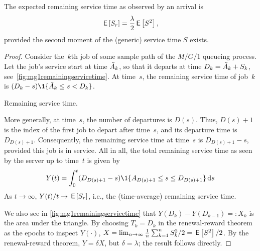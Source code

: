 \documentclass[stochastic-or.tex]{subfiles}
\begin{document}
\begin{theorem}
The expected remaining service time as observed by an arrival is
\begin{equation*}
\,\mathsf{E}\left[S_r\right] = \frac{\lambda}2 \,\mathsf{E}\left[S^2\right],
\end{equation*}
provided the second moment of the (generic) service time $S$ exists.
\end{theorem}
\begin{proof}
Consider the~$k$th job of some sample path of the $M/G/1$ queueing process.
Let the job's service start at time $\tilde A_{k}$, so that it departs at time $D_k=\tilde A_k + S_k$, see~\cref{fig:mg1remainingservicetime}.
At time~$s$,  the remaining service time of job~$k$ is
$(D_k-s)\1{\As_k \leq s < D_k}$.
\begin{marginfigure}
 \caption{Remaining service time.}
 \label{fig:mg1remainingservicetime}
\end{marginfigure}
More generally, at time~$s$, the number of departures is $D(s)$.
Thus, $D(s)+1$ is the index of the first job to depart after time~$s$, and its departure time is $D_{D(s)+1}$.
Consequently, the remaining service time at time~$s$ is $D_{D(s)+1}-s$, provided this job is in service.
All in all, the total remaining service time as seen by the server up to time~$t$ is given by
 \begin{equation*}
 Y(t) = \int_0^t (D_{D(s)+1}-s)\1{A_{D(s)+1} \leq s \leq D_{D(s)+1}} \d s
 \end{equation*}
As $t \to \infty$, $Y(t)/t \to \,\mathsf{E}\left[S_{r}\right]$, i.e., the  (time-average) remaining service time.

 We also see in \cref{fig:mg1remainingservicetime} that $Y(D_k) - Y(D_{k-1}) =:X_k$ is the area under the triangle.
 By choosing $T_k=D_k$ in the renewal-reward theorem as the epochs to inspect $Y(\cdot)$, $X=\lim_{n\to\infty} \frac{1}{n}\sum_{k=1}^n S_k^2/ 2 = \,\mathsf{E}\left[S^2\right]/2$.
 By the renewal-reward theorem, $Y=\delta X$, but $\delta = \lambda$;  the result follows directly.
\end{proof}
\end{document}

